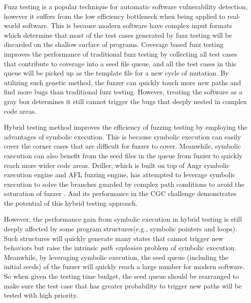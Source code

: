 Fuzz testing is a popular technique for automatic software vulnerability detection, 
however it suffers from the low efficiency bottleneck when being applied to real-world software. 
This is because modern software have complex input formats which determine that most of the test cases generated by fuzz testing will be discarded on the shallow surface of programs. 
Coverage based fuzz testing improves the performance of traditional fuzz testing by collecting all test cases that contribute to coverage into a seed file queue, and all the test cases in this queue will be picked up as the template file for a new cycle of mutation.
By utilizing such genetic method, the fuzzer can quickly touch more new paths and find more bugs than traditional fuzz testing. However, treating the software as a gray box determines it still cannot trigger the bugs that deeply nested in complex code areas.  

Hybrid testing method improves the efficiency of fuzzing testing by employing the advantages of symbolic execution.  
This is because symbolic execution can easily cover the corner cases that are difficult for fuzzer to cover. Meanwhile, symbolic execution can also benefit from the seed files in the queue from fuzzer to quickly reach more wider code areas. 
Driller, which is built on top of Angr symbolic execution engine and AFL fuzzing engine, has attempted to leverage symbolic execution to solve the branches guarded by complex path conditions to avoid the saturation of fuzzer \cite{stephens2016driller}. And its performance in the CGC challenge \cite{online:CGC} demonstrates the potential of this hybrid testing approach.

However, the performance gain from symbolic execution in hybrid testing is still deeply affected by some program structures(e.g., symbolic pointers and loops). Such structures will quickly generate many states that cannot trigger new behaviors but raise the intrinsic \textit{path explosion} problem of symbolic execution.
Meanwhile, by leveraging symbolic execution, the seed queue (including the initial seeds) of the fuzzer will quickly reach a large number for modern software. So when given the testing time budget, the seed queue should be rearranged to make sure the test case that has greater probability to trigger new paths will be tested with high priority.  

